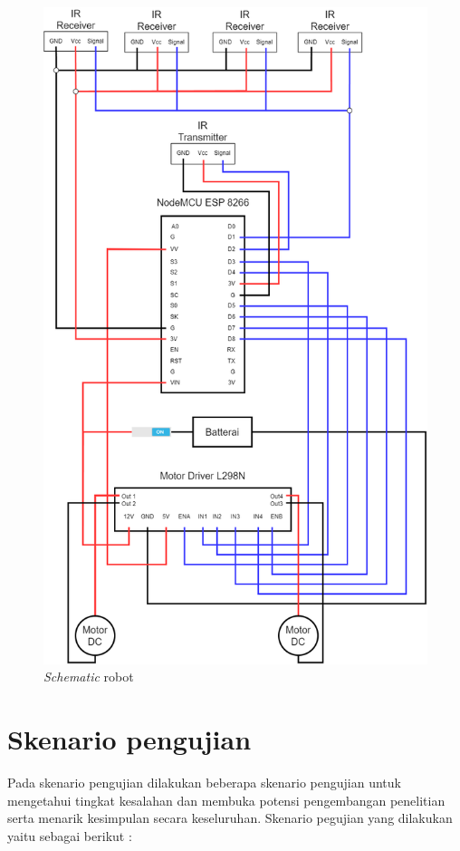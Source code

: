 \begin{figure}[H]
  \centering
  \includegraphics[width=0.5\linewidth]{../Gambar/schematic.png}
  \caption{\emph{Schematic} robot}
  \label{fig:schematic}
\end{figure}

\section{Skenario pengujian}
Pada skenario pengujian dilakukan beberapa skenario pengujian untuk mengetahui tingkat kesalahan dan membuka potensi pengembangan penelitian serta menarik kesimpulan secara keseluruhan. Skenario pegujian yang dilakukan yaitu sebagai berikut :
